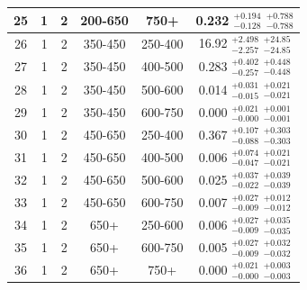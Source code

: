 \begin{table}[htbp]
\begin{centering}
\begin{tabular}{|c|c|c|c|c||c|}
 \hline
             25 &               1 &               2 &         200-650 &            750+ & 0.232 $^{+0.194}_{-0.128}$  $^{+0.788}_{-0.788}$  \\
 \hline
             26 &               1 &               2 &         350-450 &         250-400 & 16.92 $^{+2.498}_{-2.257}$  $^{+24.85}_{-24.85}$  \\
 \hline
             27 &               1 &               2 &         350-450 &         400-500 & 0.283 $^{+0.402}_{-0.257}$  $^{+0.448}_{-0.448}$  \\
 \hline
             28 &               1 &               2 &         350-450 &         500-600 & 0.014 $^{+0.031}_{-0.015}$  $^{+0.021}_{-0.021}$  \\
 \hline
             29 &               1 &               2 &         350-450 &         600-750 & 0.000 $^{+0.021}_{-0.000}$  $^{+0.001}_{-0.001}$  \\
 \hline
             30 &               1 &               2 &         450-650 &         250-400 & 0.367 $^{+0.107}_{-0.088}$  $^{+0.303}_{-0.303}$  \\
 \hline
             31 &               1 &               2 &         450-650 &         400-500 & 0.006 $^{+0.074}_{-0.047}$  $^{+0.021}_{-0.021}$  \\
 \hline
             32 &               1 &               2 &         450-650 &         500-600 & 0.025 $^{+0.037}_{-0.022}$  $^{+0.039}_{-0.039}$  \\
 \hline
             33 &               1 &               2 &         450-650 &         600-750 & 0.007 $^{+0.027}_{-0.009}$  $^{+0.012}_{-0.012}$  \\
 \hline
             34 &               1 &               2 &            650+ &         250-600 & 0.006 $^{+0.027}_{-0.009}$  $^{+0.035}_{-0.035}$  \\
 \hline
             35 &               1 &               2 &            650+ &         600-750 & 0.005 $^{+0.027}_{-0.009}$  $^{+0.032}_{-0.032}$  \\
 \hline
             36 &               1 &               2 &            650+ &            750+ & 0.000 $^{+0.021}_{-0.000}$  $^{+0.003}_{-0.003}$  \\
 \hline
\end{tabular}
\par\end{centering}
\end{table}


